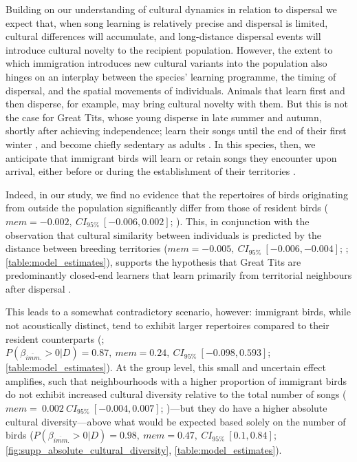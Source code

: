 Building on our understanding of cultural dynamics in relation to dispersal we expect that, when song learning is relatively precise and dispersal is limited, cultural differences will accumulate, and long-distance dispersal events will introduce cultural novelty to the recipient population. However, the extent to which immigration introduces new cultural variants into the population also hinges on an interplay between the species' learning programme, the timing of dispersal, and the spatial movements of individuals. Animals that learn first and then disperse, for example, may bring cultural novelty with them. But this is not the case for Great Tits, whose young disperse in late summer and autumn, shortly after achieving independence; learn their songs until the end of their first winter \parencite{rivera-gutierrez2011}, and become chiefly sedentary as adults \parencite{greenwood1979, dhondt1979, dingemanse2003}. In this species, then, we anticipate that immigrant birds will learn or retain songs they encounter upon arrival, either before or during the establishment of their territories \parencite{keen2020, graham2018}. 

Indeed, in our study, we find no evidence that the repertoires of birds originating from outside the population significantly differ from those of resident birds ($mem = -0.002,~CI_{95\%}~[-0.006, 0.002]$; ). This, in conjunction with the observation that cultural similarity between individuals is predicted by the distance between breeding territories ($mem = -0.005,~CI_{95\%}~[-0.006, -0.004]$; ; \autoref{table:model_estimates}), supports the hypothesis that Great Tits are predominantly closed-end learners that learn primarily from territorial neighbours after dispersal \parencite{mcgregor1982b, rivera-gutierrez2011, graham2017}.

This leads to a somewhat contradictory scenario, however: immigrant birds, while not acoustically distinct, tend to exhibit larger repertoires compared to their resident counterparts (; $P(\beta_{\overline{imm}.} > 0 | D) = 0.87,~mem=0.24,~CI_{95\%}~[-0.098, 0.593]$; \autoref{table:model_estimates}). At the group level, this small and uncertain effect amplifies, such that neighbourhoods with a higher proportion of immigrant birds do not exhibit increased cultural diversity relative to the total number of songs ($mem=~0.002~CI_{95\%}~[-0.004, 0.007]$; )---but they do have a higher absolute cultural diversity---above what would be expected based solely on the number of birds ($P(\beta_{\overline{imm}.} > 0 | D) = 0.98,~mem=0.47,~CI_{95\%}~[0.1, 0.84]$; \autoref{fig:supp_absolute_cultural_diversity}, \autoref{table:model_estimates}). 

